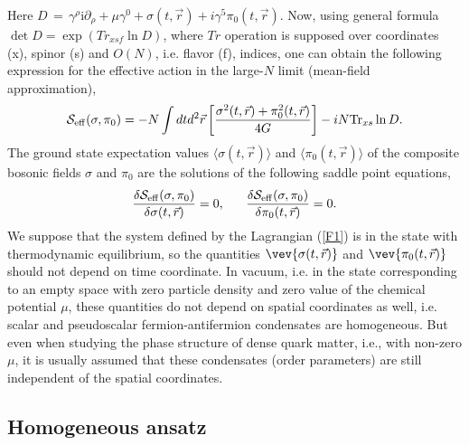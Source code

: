 \documentclass[12pt,a4paper]{article}
\begin{document}
Here $D\,=\,\gamma^\rho\mathrm{i}\partial_\rho
+\mu\gamma^0+\sigma (t,\vec r)+i\gamma^5\pi_0 (t,\vec r)$. Now, using general formula
$\det D=\exp\left(Tr_{xsf}\ln D\right)$, where $Tr$ operation is supposed over coordinates (x),
spinor (s) and $O(N)$, i.e. flavor (f), indices, one can obtain the following expression for the effective action in the large-$N$ limit (mean-field approximation),
\begin{equation}
{\cal S}_{\rm {eff}}(\sigma,\pi_0)
=-N\int dtd^2\vec r\left[\frac{\sigma^2(t,\vec r)+\pi^2_0 (t,\vec r)}{4G}\right]-iN {\rm Tr}_{xs}\ln D.
\label{F6}
\end{equation}
The ground state expectation values  $\langle\sigma(t,\vec r)\rangle$ and $\langle\pi_0(t,\vec r)\rangle$ of
the composite bosonic fields $\sigma$ and $\pi_0$ are the solutions of the following
saddle point equations,
\begin{eqnarray}
\frac{\delta {\cal S}_{\rm {eff}}(\sigma,\pi_0)}{\delta\sigma (t,\vec r)}=0,~~~~~
\frac{\delta {\cal S}_{\rm {eff}}(\sigma,\pi_0)}{\delta\pi_0 (t,\vec r)}=0.
\label{F7}
\end{eqnarray}
We suppose that the system defined by the Lagrangian (\ref{F1}) is in the state with thermodynamic equilibrium, so the quantities
$\vev{\sigma(t,\vec r)}$ and $\vev{\pi_0(t,\vec r)}$ should not depend on time coordinate.
In vacuum, i.e. in the state corresponding to an empty space with zero particle density and zero
value of the chemical potential $\mu$, these quantities do not depend on spatial coordinates as
well, i.e. scalar and pseudoscalar fermion-antifermion condensates are homogeneous. But
even when studying the phase structure of dense quark matter, i.e., with non-zero $\mu$, it is
usually assumed that these condensates (order parameters) are still independent of the spatial
coordinates.

\subsection{Homogeneous ansatz}
\end{document}
